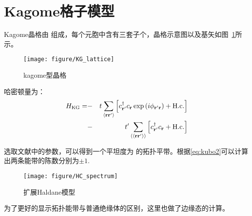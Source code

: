 \section{Kagome格子模型}
Kagome晶格由 组成，每个元胞中含有三套子个，晶格示意图以及基矢如图~\ref{fig:KGlattice}所示。


\begin{figure}
 \centering
 \texttt{[image: figure/KG\_lattice]}
 \caption{kagome型晶格}
 \label{fig:KGlattice}
\end{figure}

哈密顿量为：
\begin{eqnarray}
H_{\rm KG}= &-&t\sum_{\langle\mathbf{r}\mathbf{r}^{ \prime}\rangle}
\left[c^{\dagger}_{\mathbf{r}^{ \prime}}c_{\mathbf{r}}\exp\left(i\phi_{\mathbf{r}^{ \prime}\mathbf{r}}\right)+\textrm{H.c.}\right]\nonumber\\
&-&t^{\prime}\sum_{\langle\langle\mathbf{r}\mathbf{r}^{\prime}\rangle\rangle}
\left[c^{\dagger}_{\mathbf{r}^{\prime}}c_{\mathbf{r}}+\textrm{H.c.}\right]%
\label{eq:kg}
\end{eqnarray}

选取\cite{}文献中的参数，可以得到一个平坦度为 的拓扑平带。根据\ref{eq:kubo2}可以计算出两条能带的陈数分别为$\pm1$.
\begin{figure}[h]
  \centering
  \texttt{[image: figure/HC\_spectrum]}
\caption{扩展Haldane模型}
\label{fig:hc_spectrum}
\end{figure}


为了更好的显示拓扑能带与普通绝缘体的区别，这里也做了边缘态的计算。